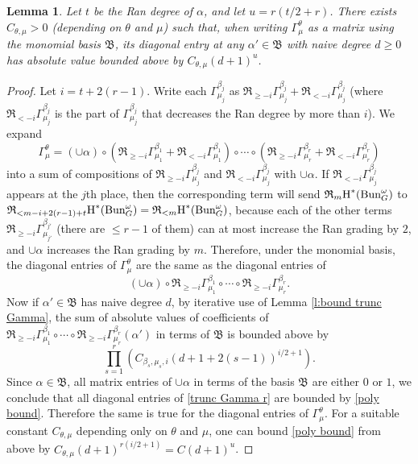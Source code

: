 \documentclass[reqno]{amsart}
\numberwithin{equation}{subsection}
\newtheorem{lemma}[subsubsection]{Lemma}
\theoremstyle{definition}
\newcommand\frB{\mathfrak{B}}
\newcommand\frR{\mathfrak{R}}
\newcommand{\Bun}{\textup{Bun}}
\renewcommand\c\circ
\newcommand{\cohog}[2]{\textup{H}^{#1}({#2})}     %
\renewcommand\a\alpha
\renewcommand\b\beta
\newcommand\G\Gamma
\renewcommand{\th}{\theta}
\newcommand{\om}{\omega}
\begin{document}
\begin{lemma}\label{l:bound diag entry} Let $t$ be the Ran degree of $\a$, and let $u=r(t/2+r)$. There exists $C_{\th,\mu}>0$ (depending on $\th$ and $\mu$) such that, when writing $\G^\th_\mu$ as a matrix using the monomial basis $\frB$, its diagonal entry at any $\a'\in \frB$ with naive degree $d\ge 0$ has absolute value bounded above by $C_{\th,\mu} (d+1)^{u}$.
\end{lemma}
\begin{proof} Let $i=t+2(r-1)$. Write each $\G^{\b_j}_{\mu_j}$ as $\frR_{\ge -i}\G^{\b_j}_{\mu_j}+\frR_{<-i}\G^{\b_j}_{\mu_j}$ (where $\frR_{<-i}\G^{\b_j}_{\mu_j}$ is the part of $\G^{\b_j}_{\mu_j}$ that decreases the Ran degree by more than $i$). We expand
\begin{equation*}
\G^\th_\mu=(\cup \a)\c (\frR_{\ge -i}\G^{\b_1}_{\mu_1}+\frR_{< -i}\G^{\b_1}_{\mu_1})\c\cdots\c (\frR_{\ge -i}\G^{\b_r}_{\mu_r}+\frR_{<-i}\G^{\b_r}_{\mu_r})
\end{equation*}
into a sum of compositions of $\frR_{\ge -i}\G^{\b_j}_{\mu_j}$ and $\frR_{< -i}\G^{\b_j}_{\mu_j}$ with $\cup \a$. If $\frR_{< -i}\G^{\b_j}_{\mu_j}$ appears at the $j$th place, then the corresponding term will send $\frR_{m}\cohog{*}{\Bun_G^\om}$ to $\frR_{< m-i+2(r-1)+t}\cohog{*}{\Bun_G^\om}=\frR_{<m}\cohog{*}{\Bun_G^\om}$, because each of the other terms $\frR_{\ge -i}\G^{\b_{j'}}_{\mu_{j'}}$ (there are $\le r-1$ of them) can at most increase the Ran grading by $2$, and $\cup \a$ increases the Ran grading by $m$. Therefore, under the monomial basis, the diagonal entries of $\G^\th_\mu$ are the same as the diagonal entries of 
\begin{equation}\label{trunc Gamma r}
(\cup \a)\c \frR_{\ge -i}\G^{\b_1}_{\mu_1}\c\cdots\c \frR_{\ge -i}\G^{\b_r}_{\mu_r}.
\end{equation}
Now if $\a'\in \frB$ has naive degree $d$, by iterative use of Lemma \ref{l:bound trunc Gamma}, the sum of absolute values of coefficients of $\frR_{\ge -i}\G^{\b_1}_{\mu_1}\c\cdots\c \frR_{\ge -i}\G^{\b_r}_{\mu_r}(\a')$ in terms of $\frB$ is bounded above by 
\begin{equation}\label{poly bound}
\prod_{s=1}^{r}\left(C_{\b_s,\mu_s,i}(d+1+2(s-1))^{i/2+1}\right).
\end{equation}
Since $\a\in \frB$, all matrix entries of $\cup\a$ in terms of the basis $\frB$ are either $0$ or $1$, we conclude that all diagonal entries of \eqref{trunc Gamma r} are bounded by \eqref{poly bound}. Therefore the same is true for the diagonal entries of $\G^\th_\mu$. For a suitable constant $C_{\th,\mu}$ depending only on $\th$ and $\mu$, one can bound \eqref{poly bound} from above by $C_{\th, \mu} (d+1)^{r(i/2+1)}=C(d+1)^u$. 
\end{proof}
\end{document}
